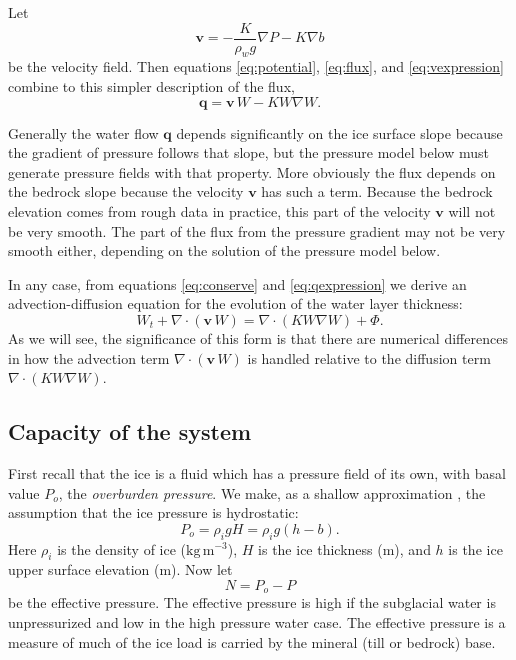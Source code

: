 \documentclass[12pt,final]{amsart}%
\newcommand\bv{\mathbf{v}}
\newcommand\bq{\mathbf{q}}
\newcommand{\Div}{\nabla\cdot}
\newcommand{\grad}{\nabla}
\begin{document}
Let
\begin{equation} \label{eq:vexpression}
  \bv = - \frac{K}{\rho_w g} \grad P - K \grad b
\end{equation}
be the velocity field.  Then equations \eqref{eq:potential}, \eqref{eq:flux}, and \eqref{eq:vexpression} combine to this simpler description of the flux,
\begin{equation} \label{eq:qexpression}
  \bq = \bv\, W - K W \grad W.
\end{equation}

Generally the water flow $\bq$ depends significantly on the ice surface slope because the gradient of pressure follows that slope, but the pressure model below must generate pressure fields with that property.  More obviously the flux depends on the bedrock slope because the velocity $\bv$ has such a term.  Because the bedrock elevation comes from rough data in practice, this part of the velocity $\bv$ will not be very smooth.  The part of the flux from the pressure gradient may not be very smooth either, depending on the solution of the pressure model below.

In any case, from equations \eqref{eq:conserve} and \eqref{eq:qexpression} we derive an advection-diffusion equation \citep{HundsdorferVerwer2010,MortonMayers} for the evolution of the water layer thickness:
\begin{equation} \label{eq:adeqn}
  W_t + \Div\left(\bv\, W\right) = \Div \left(K W \grad W\right) + \Phi.
\end{equation}
As we will see, the significance of this form is that there are numerical differences in how the advection term $\Div\left(\bv\, W\right)$ is handled relative to the diffusion term $\Div \left(K W \grad W\right)$.

\subsection*{Capacity of the system}  First recall that the ice is a fluid which has a pressure field of its own, with basal value $P_o$, the \emph{overburden pressure}.  We make, as a shallow approximation \citep{GreveBlatter2009}, the assumption that the ice pressure is hydrostatic:
\begin{equation} \label{eq:hydrostatic}
  P_o = \rho_i g H = \rho_i g (h-b).
\end{equation}
Here $\rho_i$ is the density of ice ($\text{kg}\,\text{m}^{-3}$), $H$ is the ice thickness (m), and $h$ is the ice upper surface elevation (m).  Now let
\begin{equation}
N = P_o - P\label{eq:effective}
\end{equation}
be the effective pressure.  The effective pressure is high if the subglacial water is unpressurized and low in the high pressure water case.  The effective pressure is a measure of much of the ice load is carried by the mineral (till or bedrock) base.
\end{document}
